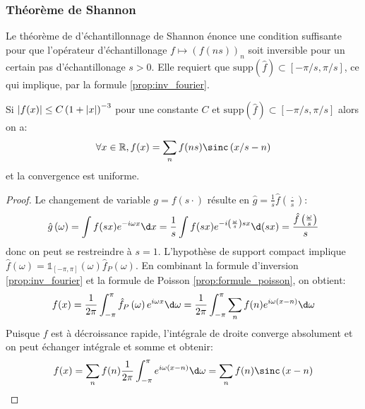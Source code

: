 \documentclass{cours}
\begin{document}
\subsubsection{Théorème de Shannon}
Le théorème de d'échantillonnage de Shannon énonce une condition suffisante pour que l'opérateur d'échantillonage $f \mapsto \left(f(ns)\right)_{n}$ soit inversible pour un certain pas d'échantillonage $s > 0$.
Elle requiert que $\mathrm{supp}\left(\hat{f}\right) \subset \left[-\pi/s, \pi/s\right]$, ce qui implique, par la formule \ref{prop:inv_fourier}.

\begin{thm}
	Si $\left|f(x)\right| \leq C\left(1 + \left|x\right|\right)^{-3}$ pour une constante $C$ et $\mathrm{supp}\left(\hat{f}\right)\subset\left[-\pi/s, \pi/s\right]$ alors on a:
	\begin{equation*}
		\forall x \in \R, f(x) = \sum_{n}f(ns)\sinc\left(x/s - n\right)
	\end{equation*}
	et la convergence est uniforme.
	\label{thm:shannon}
\end{thm}

\begin{proof}
	Le changement de variable $g = f(s\cdot)$ résulte en $\hat{g} = \frac{1}{s}\hat{f}\left(\frac{\cdot}{s}\right)$:
	\begin{equation*}
		\hat{g}\left(\omega\right) = \int f(sx)e^{-i\omega x}\d x = \frac{1}{s}\int f(sx) e^{-i\left(\frac{\omega}{s}\right)sx}\d (sx) = \frac{\hat{f}\left(\frac{\omega}{s}\right)}{s}
	\end{equation*}
	donc on peut se restreindre à $s = 1$.
	L'hypothèse de support compact implique $\hat{f}\left(\omega\right) = \mathds{1}_{\left[-\pi, \pi\right]}\left(\omega\right)\hat{f}_{P}\left(\omega\right)$.
	En combinant la formule d'inversion \ref{prop:inv_fourier} et la formule de Poisson \ref{prop:formule_poisson}, on obtient:
	\begin{equation*}
		f(x) = \frac{1}{2\pi}\int_{-\pi}^{\pi}\hat{f}_{P}\left(\omega\right)e^{i\omega x}\d\omega = \frac{1}{2\pi}\int_{-\pi}^{\pi}\sum_{n}f(n)e^{i\omega\left(x - n\right)}\d \omega
	\end{equation*}
	Puisque $f$ est à décroissance rapide, l'intégrale de droite converge absolument et on peut échanger intégrale et somme et obtenir:
	\begin{equation*}
		f(x) = \sum_{n}f(n)\frac{1}{2\pi}\int_{-\pi}^{\pi}e^{i\omega(x-n)}\d\omega = \sum_{n}f(n)\sinc\left(x - n\right)
	\end{equation*}
\end{proof}
\end{document}
